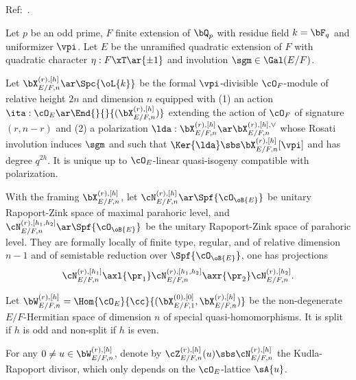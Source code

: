 \documentclass[article, a4paper, twoside]{universal}
\begin{document}
\confighead{}{}{}



Ref:~\cite{Cho2019,LRZ2024Quasi}.

\begin{stp}
	Let $p$ be an odd prime, $F$ finite extension of $\bQ_{p}$ with residue field $k=\bF_{q}$ and uniformizer $\vpi$. Let $E$ be the unramified quadratic extension of $F$ with quadratic character $\eta:F\xT\ar\{\pm1\}$ and involution $\sgm\in\Gal(E/F)$.


	Let $\bX_{E/F, n}^{(r),[h]}\ar\Spc{\oL{k}}$ be the formal $\vpi$-divisible $\cO_{F}$-module of relative height $2n$ and dimension $n$ equipped with (1) an action $\ita:\cO_{E}\ar\End{}{}{(\bX_{E/F,n}^{(r), [h]})}$ extending the action of $\cO_{F}$ of signature $(r,n-r)$ and (2) a polarization $\lda:\bX_{E/F,n}^{(r),[h]}\ar\bX_{E/F,n}^{(r),[h],\vee}$ whose Rosati involution induces $\sgm$ and such that $\Ker{\lda}\sbs\bX_{E/F,n}^{(r),[h]}[\vpi]$ and has degree $q^{2h}$. It is unique up to $\cO_{E}$-linear quasi-isogeny compatible with polarization.


	With the framing $\bX_{E/F,n}^{(r),[h]}$, let $\cN_{E/F,n}^{(r),[h]}\ar\Spf{\cO_{\oB{E}}}$ be unitary Rapoport-Zink space of maximal parahoric level, and $\cN_{E/F,n}^{(r),[h_{1},h_{2}]}\ar\Spf{\cO_{\oB{E}}}$ be the unitary Rapoport-Zink space of parahoric level. They are formally locally of finite type, regular, and of relative dimension $n-1$ and of semistable reduction over $\Spf{\cO_{\oB{E}}}$, one has projections
	\[
		\cN_{E/F,n}^{(r),[h_{1}]}\axl{\pr_{1}}\cN_{E/F,n}^{(r),[h_{1},h_{2}]}\axr{\pr_{2}}\cN_{E/F,n}^{(r),[h_{2}]}.
	\]


	Let $\bW_{E/F,n}^{(r),[h]}=\Hom{\cO_{E}}{\cc}{(\bX_{E/F,1}^{(0),[0]},\bX_{E/F,n}^{(r),[h]})}$ be the non-degenerate $E/F$-Hermitian space of dimension $n$ of special quasi-homomorphisms. It is split if $h$ is odd and non-split if $h$ is even.

	For any $0\neq u\in\bW_{E/F,n}^{(r),[h]}$, denote by $\cZ_{E/F,n}^{(r),[h]}(u)\sbs\cN_{E/F,n}^{(r),[h]}$ the Kudla-Rapoport divisor, which only depends on the $\cO_{E}$-lattice $\sA{u}$.

\end{stp}

\end{document}
